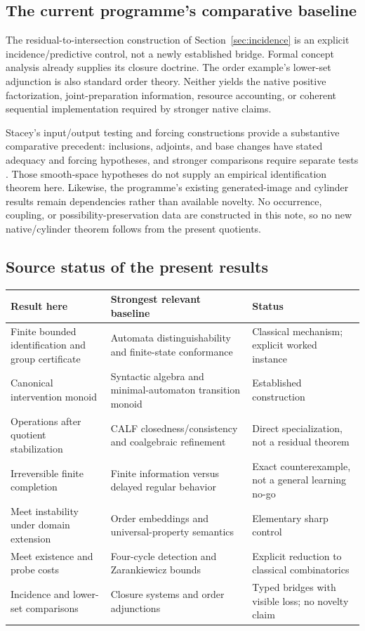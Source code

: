 \documentclass[11pt]{article}
\theoremstyle{remark}
\begin{document}
\subsection{The current programme's comparative baseline}

The residual-to-intersection construction of Section~\ref{sec:incidence} is an explicit incidence/predictive control, not a newly established bridge. Formal concept analysis already supplies its closure doctrine. The order example's lower-set adjunction is also standard order theory. Neither yields the native positive factorization, joint-preparation information, resource accounting, or coherent sequential implementation required by stronger native claims.

Stacey's input/output testing and forcing constructions provide a substantive comparative precedent: inclusions, adjoints, and base changes have stated adequacy and forcing hypotheses, and stronger comparisons require separate tests \cite{Stacey}. Those smooth-space hypotheses do not supply an empirical identification theorem here. Likewise, the programme's existing generated-image and cylinder results remain dependencies rather than available novelty. No occurrence, coupling, or possibility-preservation data are constructed in this note, so no new native/cylinder theorem follows from the present quotients.

\subsection{Source status of the present results}

\begin{center}
\begin{tabularx}{\textwidth}{@{}p{}XX@{}}
\toprule
Result here & Strongest relevant baseline & Status \\
\midrule
Finite bounded identification and group certificate & Automata distinguishability and finite-state conformance & Classical mechanism; explicit worked instance \\
Canonical intervention monoid & Syntactic algebra and minimal-automaton transition monoid & Established construction \\
Operations after quotient stabilization & CALF closedness/consistency and coalgebraic refinement & Direct specialization, not a residual theorem \\
Irreversible finite completion & Finite information versus delayed regular behavior & Exact counterexample, not a general learning no-go \\
Meet instability under domain extension & Order embeddings and universal-property semantics & Elementary sharp control \\
Meet existence and probe costs & Four-cycle detection and Zarankiewicz bounds & Explicit reduction to classical combinatorics \\
Incidence and lower-set comparisons & Closure systems and order adjunctions & Typed bridges with visible loss; no novelty claim \\
\bottomrule
\end{tabularx}
\end{center}
\end{document}
